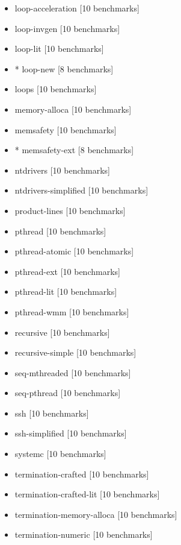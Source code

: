 \documentclass[envcountsame]{llncs}
\begin{document}
\begin{itemize}
\begin{itemize}
\item     loop-acceleration [10 benchmarks]
\item     loop-invgen [10 benchmarks]
\item     loop-lit [10 benchmarks]
\item   * loop-new [8 benchmarks]
\item     loops [10 benchmarks]
\item     memory-alloca [10 benchmarks]
\item     memsafety [10 benchmarks]
\item   * memsafety-ext [8 benchmarks]
\item     ntdrivers [10 benchmarks]
\item     ntdrivers-simplified [10 benchmarks]
\item     product-lines [10 benchmarks]
\item     pthread [10 benchmarks]
\item     pthread-atomic [10 benchmarks]
\item     pthread-ext [10 benchmarks]
\item     pthread-lit [10 benchmarks]
\item     pthread-wmm [10 benchmarks]
\item     recursive [10 benchmarks]
\item     recursive-simple [10 benchmarks]
\item     seq-mthreaded [10 benchmarks]
\item     seq-pthread [10 benchmarks]
\item     ssh [10 benchmarks]
\item     ssh-simplified [10 benchmarks]
\item     systemc [10 benchmarks]
\item     termination-crafted [10 benchmarks]
\item     termination-crafted-lit [10 benchmarks]
\item     termination-memory-alloca [10 benchmarks]
\item     termination-numeric [10 benchmarks]
\end{itemize}
\end{itemize}
\end{document}
